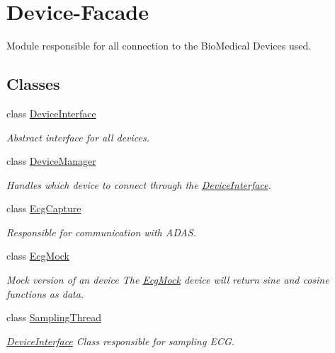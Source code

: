 \hypertarget{group__Device-Facade}{}\section{Device-\/\+Facade}
\label{group__Device-Facade}


Module responsible for all connection to the Bio\+Medical Devices used.  


\subsection*{Classes}
\begin{DoxyCompactItemize}
\item 
class \hyperlink{classDeviceInterface}{Device\+Interface}
\begin{DoxyCompactList}\small\item\em Abstract interface for all devices. \end{DoxyCompactList}\item 
class \hyperlink{classDeviceManager}{Device\+Manager}
\begin{DoxyCompactList}\small\item\em Handles which device to connect through the \hyperlink{classDeviceInterface}{Device\+Interface}. \end{DoxyCompactList}\item 
class \hyperlink{classEcgCapture}{Ecg\+Capture}
\begin{DoxyCompactList}\small\item\em Responsible for communication with A\+D\+AS. \end{DoxyCompactList}\item 
class \hyperlink{classEcgMock}{Ecg\+Mock}
\begin{DoxyCompactList}\small\item\em Mock version of an device The \hyperlink{classEcgMock}{Ecg\+Mock} device will return sine and cosine functions as data. \end{DoxyCompactList}\item 
class \hyperlink{classSamplingThread}{Sampling\+Thread}
\begin{DoxyCompactList}\small\item\em \hyperlink{classDeviceInterface}{Device\+Interface} Class responsible for sampling E\+CG. \end{DoxyCompactList}\end{DoxyCompactItemize}
